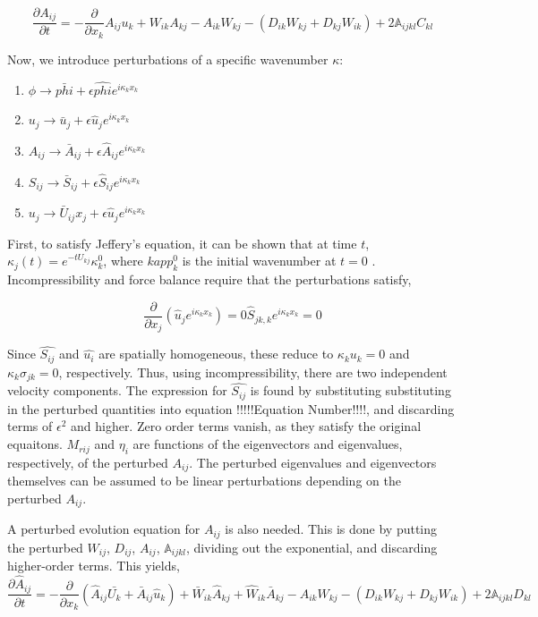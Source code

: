 \documentclass{report}
\begin{document}
\begin{equation}
   \frac{\partial A_{ij}}{\partial t} = -\frac{\partial}{\partial x_k} A_{ij} u_k + W_{ik} A_{kj} - A_{ik} W_{kj} - (D_{ik}W_{kj} + D_{kj}W_{ik}) + 2 \mathbb{A}_{ijkl}C_{kl}
\end{equation}

Now, we introduce perturbations of a specific wavenumber $\kappa$:

\begin{enumerate}
   \item $\phi \rightarrow \bar{phi} + \epsilon \hat{phi} e^{i \kappa_k x_k}$
   \item $u_j \rightarrow \bar{u}_j +  \epsilon \hat{u}_j e^{i \kappa_k x_k}$
   \item $A_{ij} \rightarrow \bar{A}_{ij} +  \epsilon \hat{A}_{ij} e^{i \kappa_k x_k}$
   \item $S_{ij} \rightarrow \bar{S}_{ij} +  \epsilon \hat{S}_{ij} e^{i \kappa_k x_k}$
   \item $u_j \rightarrow \bar{U}_{ij}x_j +  \epsilon \hat{u}_j e^{i \kappa_k x_k}$
\end{enumerate}

First, to satisfy Jeffery's equation, it can be shown that at time $t$, $\kappa_j(t)=e^{-t U_{kj}} \kappa^0_k$, where $kapp^0_k$ is the initial wavenumber at $t=0$ \citep{montgomery-smith2011}. Incompressibility and force balance require that the perturbations satisfy,

\begin{equation}
   \frac{\partial}{\partial x_j} (\hat{u}_j e^{i \kappa_k x_k}) = 0 
   \hat{S}_{jk,k} e^{i \kappa_k x_k} = 0
\end{equation}

Since $\hat{S_{ij}}$ and $\hat{u_i}$ are spatially homogeneous, these reduce to $\kappa_k u_k = 0$ and $\kappa_k \sigma_{jk} = 0$, respectively. Thus, using incompressibility, there are two independent velocity components. The expression for $\hat{S_{ij}}$ is found by substituting substituting in the perturbed quantities into equation !!!!!Equation Number!!!!, and discarding terms of $\epsilon^2$ and higher. Zero order terms vanish, as they satisfy the original equaitons. $M_{rij}$ and $\eta_i$ are functions of the eigenvectors and eigenvalues, respectively, of the perturbed $A_{ij}$. The perturbed eigenvalues and eigenvectors themselves can be assumed to be linear perturbations depending on the perturbed $A_{ij}$. 

A perturbed evolution equation for $A_{ij}$ is also needed. This is done by putting the perturbed $W_{ij}$, $D_{ij}$, $A_{ij}$, $\mathbb{A}_{ijkl}$, dividing out the exponential, and discarding higher-order terms. This yields,
\begin{equation}
   \frac{\partial \hat{A}_{ij}}{\partial t} = -\frac{\partial}{\partial x_k} \left( \hat{A}_{ij} \bar{U_k} + \bar{A}_{ij} \hat{u}_k \right)  + \bar{W}_{ik} \hat{A}_{kj} + \hat{W}_{ik} \bar{A}_{kj}  - A_{ik} W_{kj} - (D_{ik}W_{kj} + D_{kj}W_{ik}) + 2 \mathbb{A}_{ijkl}D_{kl}

\end{equation}
\end{document}
